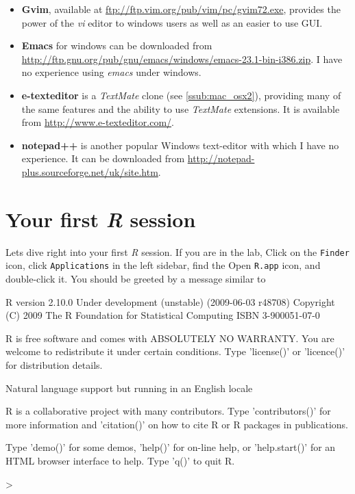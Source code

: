 \documentclass[10pt,letterpaper]{article}
\newenvironment{Schunk}{}{}
\begin{document}
\begin{itemize}
    \item \textbf{Gvim}, available at \url{ftp://ftp.vim.org/pub/vim/pc/gvim72.exe}, provides the power of the \emph{vi} editor to windows users as well as an easier to use GUI.
    \item \textbf{Emacs} for windows can be downloaded from  \url{http://ftp.gnu.org/pub/gnu/emacs/windows/emacs-23.1-bin-i386.zip}.  I have no experience using \emph{emacs} under windows.
    \item \textbf{e-texteditor} is a \emph{TextMate} clone (see  \ref{ssub:mac_osx2}), providing many of the same features and the ability to use \emph{TextMate} extensions.  It is available from  \url{http://www.e-texteditor.com/}.
    \item \textbf{notepad++} is another popular Windows text-editor with which I have no experience.  It can be downloaded from  \url{http://notepad-plus.sourceforge.net/uk/site.htm}.
\end{itemize}

\section{Your first \emph{R} session}
\label{sec:first_r_session}

Lets dive right into your first \emph{R} session.  If you are in the lab, Click on the \texttt{Finder} icon, click \texttt{Applications} in the left sidebar, find the Open \texttt{R.app} icon, and double-click it.  You should be greeted by a message similar to

\begin{Schunk}
\begin{Soutput}
R version 2.10.0 Under development (unstable) (2009-06-03 r48708)
Copyright (C) 2009 The R Foundation for Statistical Computing
ISBN 3-900051-07-0

R is free software and comes with ABSOLUTELY NO WARRANTY.
You are welcome to redistribute it under certain conditions.
Type 'license()' or 'licence()' for distribution details.

  Natural language support but running in an English locale

R is a collaborative project with many contributors.
Type 'contributors()' for more information and
'citation()' on how to cite R or R packages in publications.

Type 'demo()' for some demos, 'help()' for on-line help, or
'help.start()' for an HTML browser interface to help.
Type 'q()' to quit R.

>
\end{Soutput}
\end{Schunk}
\end{document}

